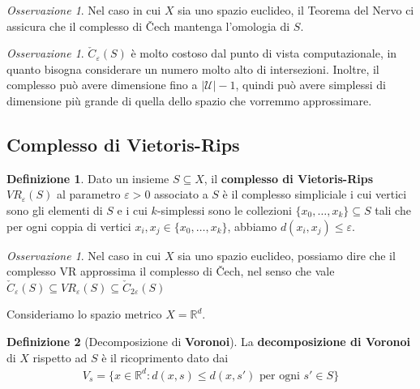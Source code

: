 \documentclass[a4paper, 12pt]{article}
\theoremstyle{definition}
\newtheorem{definition}{Definizione}[section]
\theoremstyle{remark}
\newtheorem{remark}[theorem]{Osservazione}
\begin{document}
\begin{remark}
    Nel caso in cui $X$ sia uno spazio euclideo, il Teorema del Nervo ci assicura che il complesso di \v{C}ech mantenga l'omologia di $S$.
\end{remark}

\begin{remark}
    $\check{C}_{\varepsilon}(S)$ è molto costoso dal punto di vista computazionale, in quanto bisogna considerare un numero molto alto di intersezioni. Inoltre, il complesso può avere dimensione fino a $|\mathcal{U}|-1$, quindi può avere simplessi di dimensione più grande di quella dello spazio che vorremmo approssimare.
\end{remark}

\subsection*{Complesso di Vietoris-Rips}
\begin{definition}
    Dato un insieme $S \subseteq X$, il \textbf{complesso di Vietoris-Rips} $VR_{\varepsilon}(S)$ al parametro $\varepsilon > 0$ associato a $S$ è il complesso simpliciale i cui vertici sono gli elementi di $S$ e i cui $k$-simplessi sono le collezioni $\{x_0, \ldots, x_k\} \subseteq S$ tali che per ogni coppia di vertici $x_i, x_j \in \{x_0, \ldots, x_k\}$, abbiamo $d(x_i, x_j) \leq \varepsilon$.
\end{definition}

\begin{remark}
    Nel caso in cui $X$ sia uno spazio euclideo, possiamo dire che il complesso VR approssima il complesso di \v{C}ech, nel senso che vale $\check{C}_{\varepsilon}(S) \subseteq VR_{\varepsilon}(S) \subseteq \check{C}_{2\varepsilon}(S)$
\end{remark}



Consideriamo lo spazio metrico $X=\mathbb{R}^d$.

\begin{definition}[Decomposizione di \textbf{Voronoi}]
    La \textbf{decomposizione di Voronoi} di $X$ rispetto ad $S$ è il ricoprimento dato dai
    \begin{align*}
    V_s = \{x \in \mathbb{R}^d : d(x,s) \leq d(x,s') \text{ per ogni } s' \in S\}
    \end{align*}
\end{definition}


\end{document}
